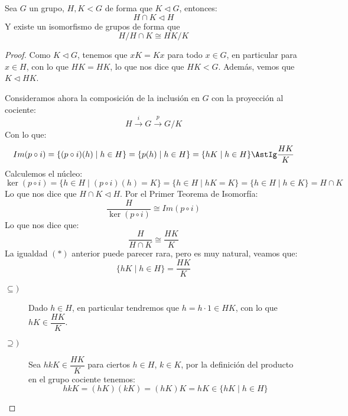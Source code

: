 \begin{teo}
    Sea $G$ un grupo, $H,K<G$ de forma que $K\lhd G$, entonces:
    \begin{equation*}
        H\cap K \lhd H
    \end{equation*}
    Y existe un isomorfismo de grupos de forma que
    \begin{equation*}
        H/H\cap K \cong HK/K
    \end{equation*}
    \begin{proof}
        Como $K \lhd G$, tenemos que $xK=Kx$ para todo $x\in G$, en particular para $x\in H$, con lo que $HK = HK$, lo que nos dice que $HK < G$. Además, vemos que $K\lhd HK$. %

        \noindent
        Consideramos ahora la composición de la inclusión en $G$ con la proyección al cociente:
        \begin{equation*}
            H\stackrel{i}{\longrightarrow} G \stackrel{p}{\longrightarrow} G/K
        \end{equation*}
        Con lo que:
        \begin{equation*}
            Im(p\circ i) = \{(p\circ i)(h) \mid h \in H\} = \{p(h) \mid h \in H \} = \{hK \mid h\in H\} \AstIg \dfrac{HK}{K}
        \end{equation*}
        Calculemos el núcleo:
        \begin{equation*}
            \ker(p\circ i) = \{h\in H \mid (p\circ i)(h) = K\} = \{h\in H \mid hK = K\} = \{h\in H \mid h\in K\} = H\cap K
        \end{equation*}
        Lo que nos dice que $H\cap K\lhd H$. Por el Primer Teorema de Isomorfía:
        \begin{equation*}
            \dfrac{H}{\ker(p\circ i)} \cong Im(p\circ i)
        \end{equation*}
        Lo que nos dice que:
        \begin{equation*}
            \dfrac{H}{H\cap K} \cong \dfrac{HK}{K}
        \end{equation*}
        La igualdad $(\ast)$ anterior puede parecer rara, pero es muy natural, veamos que:
        \begin{equation*}
            \{hK\mid h \in H\} = \dfrac{HK}{K}
        \end{equation*}
        \begin{description}
            \item [$\subseteq)$] Dado $h\in H$, en particular tendremos que $h = h\cdot 1 \in HK$, con lo que $hK \in \dfrac{HK}{K}$.
            \item [$\supseteq)$] Sea $hkK\in \dfrac{HK}{K}$ para ciertos $h\in H$, $k\in K$, por la definición del producto en el grupo cociente tenemos:
                \begin{equation*}
                    hkK = (hK)(kK) = (hK)K = hK \in \{hK \mid h\in H\}
                \end{equation*}
        \end{description}
    \end{proof}
\end{teo}

